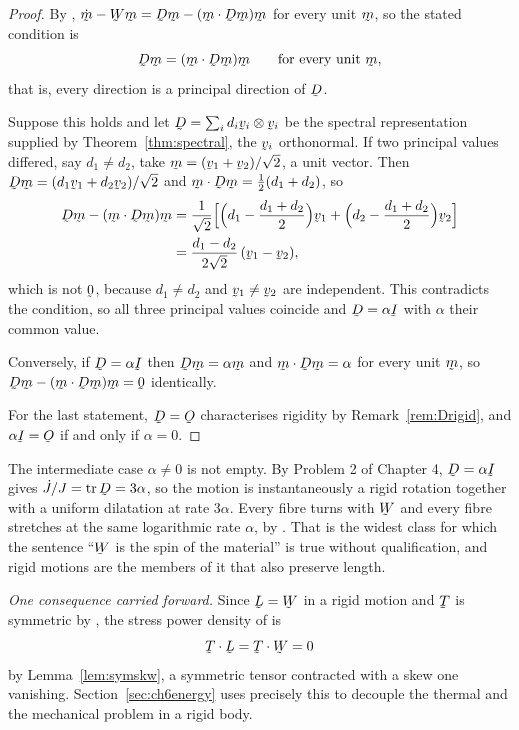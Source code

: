 \begin{proof}
By , $\dot\bm-\bW\bm=\bD\bm-(\ip\bm{\bD\bm})\bm$ for every
unit $\bm$, so the stated condition is
\[
   \bD\bm=(\ip\bm{\bD\bm})\bm\qquad\text{for every unit }\bm ,
\]
that is, every direction is a principal direction of $\bD$.

Suppose this holds and let $\bD=\sum_{i}d_{i}\bv_{i}\otimes\bv_{i}$ be
the spectral representation supplied by Theorem~\ref{thm:spectral}, the
$\bv_{i}$ orthonormal. If two principal values differed, say
$d_{1}\neq d_{2}$, take $\bm=(\bv_{1}+\bv_{2})/\sqrt2$, a unit vector.
Then $\bD\bm=(d_{1}\bv_{1}+d_{2}\bv_{2})/\sqrt2$ and
$\ip\bm{\bD\bm}=\tfrac12(d_{1}+d_{2})$, so
\[
\begin{aligned}
   \bD\bm-(\ip\bm{\bD\bm})\bm
   &=\frac{1}{\sqrt2}\Big[\Big(d_{1}-\frac{d_{1}+d_{2}}{2}\Big)\bv_{1}
   +\Big(d_{2}-\frac{d_{1}+d_{2}}{2}\Big)\bv_{2}\Big]\\
   &=\frac{d_{1}-d_{2}}{2\sqrt2}\,(\bv_{1}-\bv_{2}),
\end{aligned}
\]
which is not $\bze$, because $d_{1}\neq d_{2}$ and $\bv_{1}\neq\bv_{2}$
are independent. This contradicts the condition, so all three principal
values coincide and $\bD=\alpha\I$ with $\alpha$ their common value.

Conversely, if $\bD=\alpha\I$ then $\bD\bm=\alpha\bm$ and
$\ip\bm{\bD\bm}=\alpha$ for every unit $\bm$, so
$\bD\bm-(\ip\bm{\bD\bm})\bm=\bze$ identically.

For the last statement, $\bD=\Ob$ characterises rigidity by
Remark~\ref{rem:Drigid}, and $\alpha\I=\Ob$ if and only if $\alpha=0$.
\end{proof}

The intermediate case $\alpha\neq0$ is not empty. By Problem 2 of
Chapter 4, $\bD=\alpha\I$ gives $\dot J/J=\tr\bD=3\alpha$, so the motion
is instantaneously a rigid rotation together with a uniform dilatation
at rate $3\alpha$. Every fibre turns with $\bW$ and every fibre stretches
at the same logarithmic rate $\alpha$, by . That is the widest
class for which the sentence ``$\bW$ is the spin of the material'' is
true without qualification, and rigid motions are the members of it that
also preserve length.

\emph{One consequence carried forward.} Since $\bL=\bW$ in a rigid
motion and $\bT$ is symmetric by , the stress power density
of  is
\[
   \bT\cdot\bL=\bT\cdot\bW=0
\]
by Lemma~\ref{lem:symskw}, a symmetric tensor contracted with a skew one
vanishing. Section~\ref{sec:ch6energy} uses precisely this to decouple
the thermal and the mechanical problem in a rigid body.

